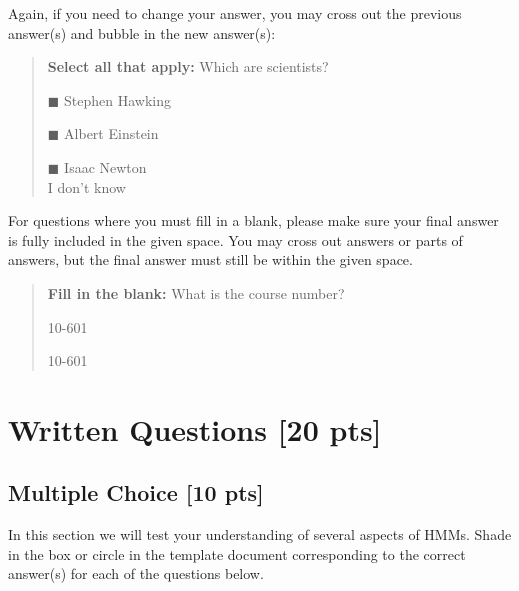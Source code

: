 \documentclass{article}
\begin{document}
Again, if you need to change your answer, you may cross out the previous answer(s) and bubble in the new answer(s):

\begin{quote}
\textbf{Select all that apply:} Which are scientists?
    \begin{list}{}
    \item $\blacksquare$ Stephen Hawking 
    \item $\blacksquare$ Albert Einstein
    \item $\blacksquare$ Isaac Newton\\
    \xcancel{$\blacksquare$} I don't know
\end{list}
\end{quote}

For questions where you must fill in a blank, please make sure your final answer is fully included in the given space. You may cross out answers or parts of answers, but the final answer must still be within the given space.

\begin{quote}
\textbf{Fill in the blank:} What is the course number?

\begin{tcolorbox}[fit,height=1cm, width=4cm, blank, borderline={1pt}{-2pt},nobeforeafter]
    \begin{center}\huge10-601\end{center}
    \end{tcolorbox}\hspace{2cm}
    \begin{tcolorbox}[fit,height=1cm, width=4cm, blank, borderline={1pt}{-2pt},nobeforeafter]
    \begin{center}\huge10-601\end{center}
    \end{tcolorbox}
\end{quote}


\clearpage

\section{Written Questions [20 pts]}
\subsection{Multiple Choice [10 pts]}
In this section we will test your understanding of several aspects of HMMs.
%
Shade in the box or circle in the template document corresponding to the correct answer(s) for each of the questions below. 
\end{document}
